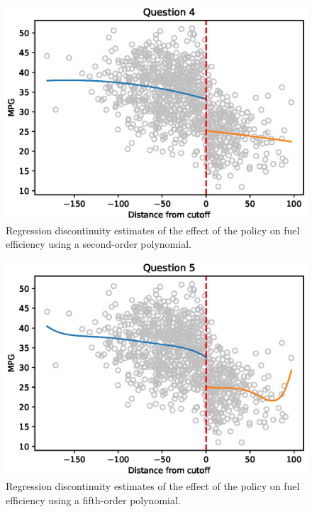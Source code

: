 \documentclass{article}
\begin{document}
\begin{figure}[ht]
\centering
\includegraphics{hw8q4.eps}
\caption{Regression discontinuity estimates of the effect of the policy on fuel efficiency using a second-order polynomial.}
\label{fig:hw8q4}
\end{figure}

\begin{figure}[ht]
\centering
\includegraphics{hw8q5.eps}
\caption{Regression discontinuity estimates of the effect of the policy on fuel efficiency using a fifth-order polynomial.}
\label{fig:hw8q5}
\end{figure}
\end{document}
